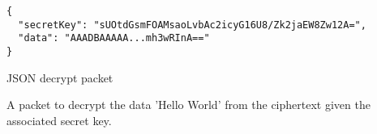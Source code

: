 \begin{listing}[H]
  \centering
  \begin{verbatim}
{
  "secretKey": "sUOtdGsmFOAMsaoLvbAc2icyG16U8/Zk2jaEW8Zw12A=",
  "data": "AAADBAAAAA...mh3wRInA=="
}
  \end{verbatim}
  \caption{
  	JSON decrypt packet
  }{
  	A packet to decrypt the data 'Hello World' from the ciphertext given the associated secret key.
  }
  \label{code:decrypt_data_json}
\end{listing}
